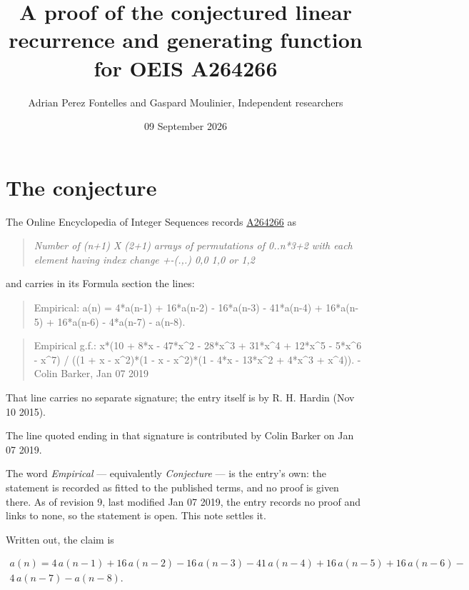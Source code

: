 \documentclass[11pt]{article}
\title{A proof of the conjectured linear recurrence and generating function for OEIS A264266}
\author{Adrian Perez Fontelles and Gaspard Moulinier, Independent researchers}
\date{09 September 2026}
\theoremstyle{definition}
\begin{document}
\maketitle
\section{The conjecture}

The Online Encyclopedia of Integer Sequences records \href{https://oeis.org/A264266}{A264266} as

\begin{quote}\itshape Number of (n+1) X (2+1) arrays of permutations of 0..n*3+2 with each element having index change +-(.,.) 0,0 1,0 or 1,2\end{quote}

and carries in its Formula section the lines:

\begin{quote}\ttfamily Empirical: a(n) = 4*a(n-1) + 16*a(n-2) - 16*a(n-3) - 41*a(n-4) + 16*a(n-5) + 16*a(n-6) - 4*a(n-7) - a(n-8).\end{quote}

\begin{quote}\ttfamily Empirical g.f.: x*(10 + 8*x - 47*x\textasciicircum{}2 - 28*x\textasciicircum{}3 + 31*x\textasciicircum{}4 + 12*x\textasciicircum{}5 - 5*x\textasciicircum{}6 - x\textasciicircum{}7) / ((1 + x - x\textasciicircum{}2)*(1 - x - x\textasciicircum{}2)*(1 - 4*x - 13*x\textasciicircum{}2 + 4*x\textasciicircum{}3 + x\textasciicircum{}4)). - Colin Barker, Jan 07 2019\end{quote}

That line carries no separate signature; the entry itself is by R. H. Hardin (Nov 10 2015).

The line quoted ending in that signature is contributed by Colin Barker on Jan 07 2019.

The word {\itshape Empirical} --- equivalently {\itshape Conjecture} --- is the entry's own: the statement is recorded as fitted to the published terms, and no proof is given there. As of revision 9, last modified Jan 07 2019, the entry records no proof and links to none, so the statement is open. This note settles it.

Written out, the claim is

\begin{multline*} a(n) = 4\,a(n-1) + 16\,a(n-2) - 16\,a(n-3) - 41\,a(n-4) + 16\,a(n-5) + 16\,a(n-6) - \\ 4\,a(n-7) - a(n-8). \end{multline*}
\end{document}

